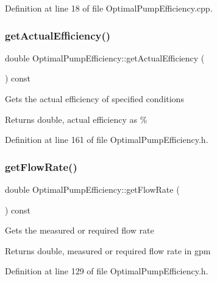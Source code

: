 Definition at line 18 of file Optimal\+Pump\+Efficiency.\+cpp.

\mbox{\label{class_optimal_pump_efficiency_aa2ac8a7c61bc28f82e30cb44b9c21008}} 
\subsubsection{\texorpdfstring{get\+Actual\+Efficiency()}{getActualEfficiency()}}
{\footnotesize\ttfamily double Optimal\+Pump\+Efficiency\+::get\+Actual\+Efficiency (\begin{DoxyParamCaption}{ }\end{DoxyParamCaption}) const\hspace{0.3cm}{\ttfamily [inline]}}

Gets the actual efficiency of specified conditions \begin{DoxyReturn}{Returns}
double, actual efficiency as \% 
\end{DoxyReturn}


Definition at line 161 of file Optimal\+Pump\+Efficiency.\+h.

\mbox{\label{class_optimal_pump_efficiency_a77c6618681b0fd3a0fc02dc49d16ee99}} 
\subsubsection{\texorpdfstring{get\+Flow\+Rate()}{getFlowRate()}}
{\footnotesize\ttfamily double Optimal\+Pump\+Efficiency\+::get\+Flow\+Rate (\begin{DoxyParamCaption}{ }\end{DoxyParamCaption}) const\hspace{0.3cm}{\ttfamily [inline]}}

Gets the measured or required flow rate \begin{DoxyReturn}{Returns}
double, measured or required flow rate in gpm 
\end{DoxyReturn}


Definition at line 129 of file Optimal\+Pump\+Efficiency.\+h.

